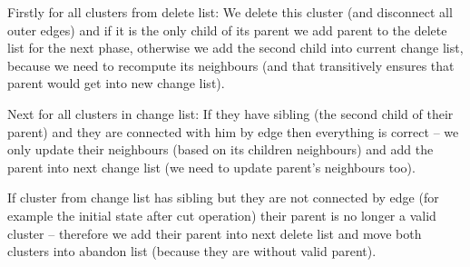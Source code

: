 Firstly for all clusters from delete list: We delete this cluster (and
disconnect all outer edges) and if it is the only child of its parent we add
parent to the delete list for the next phase, otherwise we add the second child
into current change list, because we need to recompute its neighbours (and
that transitively ensures that parent would get into new change list).

Next for all clusters in change list: If they have sibling (the second child of
their parent) and they are connected with him by edge then everything is correct
-- we only update their neighbours (based on its children neighbours) and add
the parent into next change list (we need to update parent's neighbours too).

If cluster from change list has sibling but they are not connected by edge (for
example the initial state after cut operation) their parent is no longer a
valid cluster -- therefore we add their parent into next delete list and move
both clusters into abandon list (because they are without valid parent).

